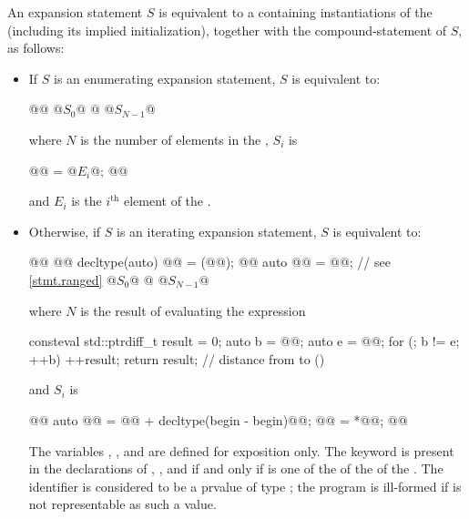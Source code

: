 \pnum
An expansion statement $S$ is equivalent to a 
containing instantiations of the 
(including its implied initialization),
together with the compound-statement of $S$, as follows:
\begin{itemize}
\item
If $S$ is an enumerating expansion statement, $S$ is equivalent to:
\begin{codeblock}
{
  @@
  @$S_{0}$@
  @\vdots@
  @$S_{N-1}$@
}
\end{codeblock}
where $N$ is the number of elements in the ,
$S_{i}$ is
\begin{codeblock}
{
  @@ = @$E_{i}$@;
  @@
}
\end{codeblock}
and $E_{i}$ is the $i^{\text{th}}$ element of the .

\item
Otherwise, if $S$ is an iterating expansion statement, $S$ is equivalent to:
\begin{codeblock}
{
  @@
  @@ decltype(auto) @@ = (@@);
  @@ auto @@ = @@;         // see \ref{stmt.ranged}
  @$S_{0}$@
  @\vdots@
  @$S_{N-1}$@
}
\end{codeblock}
where $N$ is the result of evaluating the expression
\begin{codeblock}
[&] consteval {
  std::ptrdiff_t result = 0;
  auto b = @@;
  auto e = @@;
  for (; b != e; ++b) ++result;
  return result;                                // distance from  to 
}()
\end{codeblock}
and $S_{i}$ is
\begin{codeblock}
{
  @@ auto @@ = @@ + decltype(begin - begin){@@};
  @@ = *@@;
  @@
}
\end{codeblock}
The variables , , and 
are defined for exposition only.
The keyword  is present in the declarations
of , , and 
if and only if
 is one of the  of
the  of
the .
The identifier  is considered to be
a prvalue of type ;
the program is ill-formed if
 is not representable as such a value.


\end{itemize}
